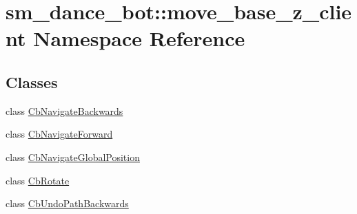 \hypertarget{namespacesm__dance__bot_1_1move__base__z__client}{}\section{sm\+\_\+dance\+\_\+bot\+:\+:move\+\_\+base\+\_\+z\+\_\+client Namespace Reference}
\label{namespacesm__dance__bot_1_1move__base__z__client}
\subsection*{Classes}
\begin{DoxyCompactItemize}
\item 
class \hyperlink{classsm__dance__bot_1_1move__base__z__client_1_1CbNavigateBackwards}{Cb\+Navigate\+Backwards}
\item 
class \hyperlink{classsm__dance__bot_1_1move__base__z__client_1_1CbNavigateForward}{Cb\+Navigate\+Forward}
\item 
class \hyperlink{classsm__dance__bot_1_1move__base__z__client_1_1CbNavigateGlobalPosition}{Cb\+Navigate\+Global\+Position}
\item 
class \hyperlink{classsm__dance__bot_1_1move__base__z__client_1_1CbRotate}{Cb\+Rotate}
\item 
class \hyperlink{classsm__dance__bot_1_1move__base__z__client_1_1CbUndoPathBackwards}{Cb\+Undo\+Path\+Backwards}
\end{DoxyCompactItemize}
